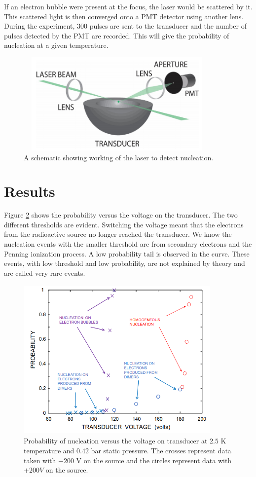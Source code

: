 If an electron bubble were present at the focus, the laser would be scattered by it. This scattered light is then converged onto a PMT detector using another lens. During the experiment, $300$ pulses are sent to the transducer and the number of pulses detected by the PMT are recorded. This will give the probability of nucleation at a given temperature.
\begin{figure}[H]
\centering 
\includegraphics[width=100mm, height=50mm]{Nucleation_Experiment/experimental_setup.png}
\caption{A schematic showing working of the laser to detect nucleation. \cite{Yang2018}}
\label{laserSetup}
\end{figure}
\section{Results}
Figure \ref{probVoltage} shows the probability versus the voltage on the transducer. The two different thresholds are evident. Switching the voltage meant that the electrons from the radioactive source no longer reached the transducer. We know the nucleation events with the smaller threshold are from secondary electrons and the Penning ionization process. A low probability tail is observed in the curve. These events, with low threshold and low probability, are not explained by theory and are called very rare events.
\begin{figure}[H]
\centering 
\includegraphics[width=100mm, height=80mm]{Nucleation_Experiment/probVsVoltage.png}
\caption{Probability of nucleation versus the voltage on transducer at $2.5$ K temperature and $0.42$ bar static pressure. The crosses represent data taken with $-200$ V on the source and the circles represent data with $+200V$ on the source. \cite{Yang2018}}
\label{probVoltage}
\end{figure}

